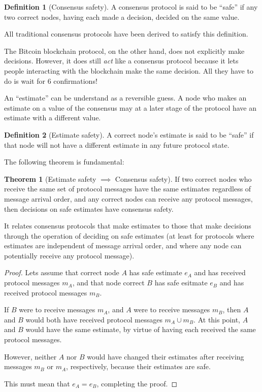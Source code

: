 \documentclass{article}
\theoremstyle{definition}
\newtheorem{thm}{Theorem}
\newtheorem{defn}{Definition}[section]
\begin{document}
\begin{defn}[Consensus safety]
A consensus protocol is said to be ``safe” if any two correct nodes, having each made a decision, decided on the same value.
\end{defn}

All traditional consensus protocols have been derived to satisfy this definition.

The Bitcoin blockchain protocol, on the other hand, does not explicitly make decisions. However, it does still \emph{act} like a consensus protocol because it lets people interacting with the blockchain make the same decision. All they have to do is wait for 6 confirmations!

An ``estimate'' can be understand as a reversible guess. A node who makes an estimate on a value of the consensus may at a later stage of the protocol have an estimate with a different value. 

\begin{defn}[Estimate safety]
A correct node's estimate is said to be ``safe'' if that node will not have a different estimate in any future protocol state.
\end{defn}

The following theorem is fundamental:

\begin{thm}[Estimate safety $\implies$ Consensus safety]
If two correct nodes who receive the same set of protocol messages have the same estimates regardless of message arrival order, and any correct nodes can receive any protocol messages, then decisions on safe estimates have consensus safety.
\end{thm}

It relates consensus protocols that make estimates to those that make decisions through the operation of deciding on safe estimates (at least for protocols where estimates are independent of message arrival order, and where any node can potentially receive any protocol message).

\begin{proof}
Lets assume that correct node $A$ has safe estimate $e_A$ and has received protocol messages $m_A$, and that node correct $B$ has safe esitmate $e_B$ and has received protocol messages $m_B$.

If $B$ were to receive messages $m_A$, and $A$ were to receive messages $m_B$, then $A$ and $B$ would both have received protocol messages $m_A \cup m_B$. At this point, $A$ and $B$ would have the same estimate, by virtue of having each received the same protocol messages.

However, neither $A$ nor $B$ would have changed their estimates after receiving messages $m_B$ or $m_A$, respectively, because their estimates are safe.

This must mean that $e_A = e_B$, completing the proof.

\end{proof}
\end{document}
